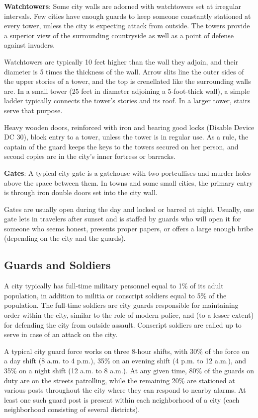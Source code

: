 \textbf{Watchtowers}: Some city walls are adorned with watchtowers set at irregular intervals. Few cities have enough guards to keep someone constantly stationed at every tower, unless the city is expecting attack from outside. The towers provide a superior view of the surrounding countryside as well as a point of defense against invaders.
				
Watchtowers are typically 10 feet higher than the wall they adjoin, and their diameter is 5 times the thickness of the wall. Arrow slits line the outer sides of the upper stories of a tower, and the top is crenellated like the surrounding walls are. In a small tower (25 feet in diameter adjoining a 5-foot-thick wall), a simple ladder typically connects the tower's stories and its roof. In a larger tower, stairs serve that purpose. 
				
Heavy wooden doors, reinforced with iron and bearing good locks (Disable Device DC 30), block entry to a tower, unless the tower is in regular use. As a rule, the captain of the guard keeps the keys to the towers secured on her person, and second copies are in the city's inner fortress or barracks.
				
\textbf{Gates}: A typical city gate is a gatehouse with two portcullises and murder holes above the space between them. In towns and some small cities, the primary entry is through iron double doors set into the city wall.
				
Gates are usually open during the day and locked or barred at night. Usually, one gate lets in travelers after sunset and is staffed by guards who will open it for someone who seems honest, presents proper papers, or offers a large enough bribe (depending on the city and the guards).
				
\subsection{Guards and Soldiers}

				
A city typically has full-time military personnel equal to 1\% of its adult population, in addition to militia or conscript soldiers equal to 5\% of the population. The full-time soldiers are city guards responsible for maintaining order within the city, similar to the role of modern police, and (to a lesser extent) for defending the city from outside assault. Conscript soldiers are called up to serve in case of an attack on the city.
				
A typical city guard force works on three 8-hour shifts, with 30\% of the force on a day shift (8 a.m. to 4 p.m.), 35\% on an evening shift (4 p.m. to 12 a.m.), and 35\% on a night shift (12 a.m. to 8 a.m.). At any given time, 80\% of the guards on duty are on the streets patrolling, while the remaining 20\% are stationed at various posts throughout the city where they can respond to nearby alarms. At least one such guard post is present within each neighborhood of a city (each neighborhood consisting of several districts).
				
